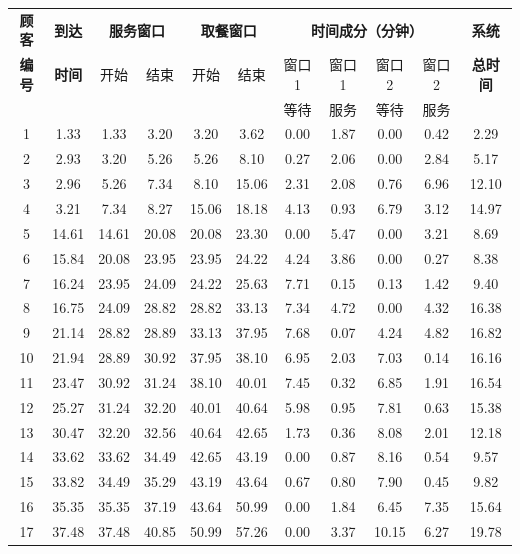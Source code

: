 \documentclass[12pt, a4paper]{article}
\begin{document}
\begin{table}[h]
\centering
\small
\begin{tabular}{ccccccccccc}
\toprule
\textbf{顾客} & \textbf{到达} & \multicolumn{2}{c}{\textbf{服务窗口}} & \multicolumn{2}{c}{\textbf{取餐窗口}} & \multicolumn{4}{c}{\textbf{时间成分（分钟）}} & \textbf{系统} \\
\textbf{编号} & \textbf{时间} & 开始 & 结束 & 开始 & 结束 & 窗口1 & 窗口1 & 窗口2 & 窗口2 & \textbf{总时间} \\
& & & & & & 等待 & 服务 & 等待 & 服务 & \\
\midrule
1 & 1.33 & 1.33 & 3.20 & 3.20 & 3.62 & 0.00 & 1.87 & 0.00 & 0.42 & 2.29 \\
2 & 2.93 & 3.20 & 5.26 & 5.26 & 8.10 & 0.27 & 2.06 & 0.00 & 2.84 & 5.17 \\
3 & 2.96 & 5.26 & 7.34 & 8.10 & 15.06 & 2.31 & 2.08 & 0.76 & 6.96 & 12.10 \\
4 & 3.21 & 7.34 & 8.27 & 15.06 & 18.18 & 4.13 & 0.93 & 6.79 & 3.12 & 14.97 \\
5 & 14.61 & 14.61 & 20.08 & 20.08 & 23.30 & 0.00 & 5.47 & 0.00 & 3.21 & 8.69 \\
6 & 15.84 & 20.08 & 23.95 & 23.95 & 24.22 & 4.24 & 3.86 & 0.00 & 0.27 & 8.38 \\
7 & 16.24 & 23.95 & 24.09 & 24.22 & 25.63 & 7.71 & 0.15 & 0.13 & 1.42 & 9.40 \\
8 & 16.75 & 24.09 & 28.82 & 28.82 & 33.13 & 7.34 & 4.72 & 0.00 & 4.32 & 16.38 \\
9 & 21.14 & 28.82 & 28.89 & 33.13 & 37.95 & 7.68 & 0.07 & 4.24 & 4.82 & 16.82 \\
10 & 21.94 & 28.89 & 30.92 & 37.95 & 38.10 & 6.95 & 2.03 & 7.03 & 0.14 & 16.16 \\
11 & 23.47 & 30.92 & 31.24 & 38.10 & 40.01 & 7.45 & 0.32 & 6.85 & 1.91 & 16.54 \\
12 & 25.27 & 31.24 & 32.20 & 40.01 & 40.64 & 5.98 & 0.95 & 7.81 & 0.63 & 15.38 \\
13 & 30.47 & 32.20 & 32.56 & 40.64 & 42.65 & 1.73 & 0.36 & 8.08 & 2.01 & 12.18 \\
14 & 33.62 & 33.62 & 34.49 & 42.65 & 43.19 & 0.00 & 0.87 & 8.16 & 0.54 & 9.57 \\
15 & 33.82 & 34.49 & 35.29 & 43.19 & 43.64 & 0.67 & 0.80 & 7.90 & 0.45 & 9.82 \\
16 & 35.35 & 35.35 & 37.19 & 43.64 & 50.99 & 0.00 & 1.84 & 6.45 & 7.35 & 15.64 \\
17 & 37.48 & 37.48 & 40.85 & 50.99 & 57.26 & 0.00 & 3.37 & 10.15 & 6.27 & 19.78 \\

\end{tabular}
\end{table}
\end{document}

